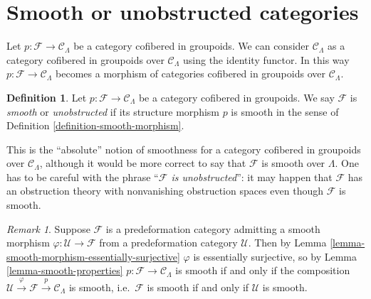 \documentclass{stacks-project}
\theoremstyle{plain}
\theoremstyle{definition}
\newtheorem{definition}[subsection]{Definition}
\theoremstyle{remark}
\newtheorem{remark}[subsection]{Remark}
\numberwithin{equation}{subsection}
\begin{document}
\section{Smooth or unobstructed categories}
\label{section-smooth}

\noindent
Let $p : \mathcal{F} \to \mathcal{C}_\Lambda$ be a category cofibered in
groupoids. We can consider $\mathcal{C}_\Lambda$ as a category
cofibered in groupoids over $\mathcal{C}_\Lambda$ using the identity
functor. In this way
$p : \mathcal{F} \longrightarrow \mathcal{C}_\Lambda$
becomes
a morphism of categories cofibered in groupoids over $\mathcal{C}_\Lambda$.

\begin{definition}
\label{definition-cofibered-groupoid-projection-smooth}
Let $p : \mathcal{F} \to \mathcal{C}_\Lambda$ be a category cofibered in
groupoids. We say $\mathcal{F}$ is {\it smooth} or {\it unobstructed}
if its structure morphism $p$ is smooth
in the sense of Definition \ref{definition-smooth-morphism}.
\end{definition}

\noindent
This is the ``absolute'' notion of smoothness for a
category cofibered in groupoids over $\mathcal{C}_\Lambda$, although
it would be more correct to say that $\mathcal{F}$ is smooth over $\Lambda$.
One has to be careful with the phrase ``{\it $\mathcal{F}$ is unobstructed}'':
it may happen that
$\mathcal{F}$ has an obstruction theory with nonvanishing obstruction spaces
even though $\mathcal{F}$ is smooth.

\begin{remark}
\label{remark-smooth-on-top}
Suppose $\mathcal{F}$ is a predeformation category admitting a smooth morphism
$\varphi : \mathcal U \to \mathcal{F}$ from a predeformation category
$\mathcal{U}$.  Then by
Lemma \ref{lemma-smooth-morphism-essentially-surjective}
$\varphi$ is essentially surjective, so by
Lemma \ref{lemma-smooth-properties}
$p: \mathcal{F} \to \mathcal{C}_\Lambda$ is smooth if and only if the
composition $\mathcal U \xrightarrow{\varphi} \mathcal{F} \xrightarrow{p}
\mathcal{C}_\Lambda$ is smooth, i.e.\ $\mathcal{F}$ is smooth if and only if
$\mathcal{U}$ is smooth.
\end{remark}
\end{document}
